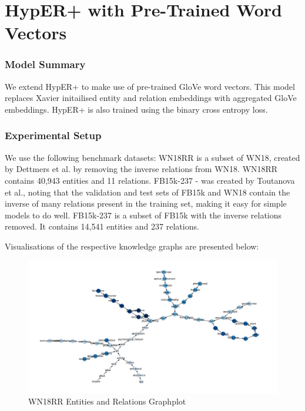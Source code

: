 
\section{HypER+ with Pre-Trained Word Vectors}

\subsubsection{Model Summary} 
We extend HypER+ to make use of pre-trained GloVe word vectors. This model replaces Xavier initailised entity and relation embeddings with aggregated GloVe embeddings. \newline
HypER+ is also trained using the binary cross entropy loss.

\subsubsection{Experimental Setup} 

We use the following benchmark datasets: WN18RR is a subset of WN18, created by Dettmers et al. by removing the inverse relations from WN18. WN18RR contains 40,943 entities and 11 relations. FB15k-237 - was created by Toutanova et al., noting that the validation and test sets of FB15k and WN18 contain the inverse of many relations present in the training set, making it easy for simple models to do well. FB15k-237 is a subset of FB15k with the inverse relations removed. It contains 14,541 entities and 237 relations. \newpage

Visualisations of the respective knowledge graphs are presented below:

\begin{figure}[H]
  	\caption{WN18RR Entities and Relations Graphplot}
   	\centering
    	\includegraphics[width=\textwidth]{WN18RR_Graph}
\end{figure}

